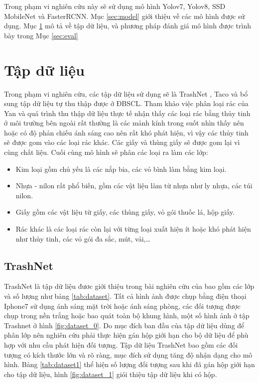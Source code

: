 \documentclass[../the.tex]{subfiles}
\begin{document}
Trong phạm vi nghiên cứu này sẽ sử dụng mô hình Yolov7, Yolov8, SSD MobileNet và FasterRCNN. Mục \ref{sec:model} giới thiệu về các mô hình được sử dụng. Mục \ref{sec:dataset} mô tả về tập dữ liệu, và phương pháp đánh giá mô hình được trình bày trong Mục \ref{sec:eval}

\section{Tập dữ liệu}
\label{sec:dataset}

{\fontsize{13}{12} \selectfont
	Trong phạm vi nghiên cứu, các tập dữ liệu sử dụng sẽ là TrashNet \cite{yang2016classification}, Taco \cite{proença2020taco} và bổ sung tập dữ liệu tự thu thập được ở ĐBSCL.
	Tham khảo việc phân loại rác của Yan \cite{yang2016classification} và quá trình thu thập dữ liệu thực tế nhận thấy các loại rác bằng thủy tinh ở môi trường bên ngoài rất thường là các mảnh kính trong suốt nhìn thấy nên hoặc có độ phản chiếu ánh sáng cao nên rất khó phát hiện, vì vậy các thủy tinh sẽ được gom vào các loại rác khác.
	Các giấy và thùng giấy sẽ được gom lại vì cùng chất liệu. Cuối cùng mô hình sẽ phân các loại ra làm các lớp:
	\begin{itemize}
		\item Kim loại gồm chủ yếu là các nắp bia, các vỏ bình làm bằng kim loại.
		\item Nhựa - nilon rất phổ biến, gồm các vật liệu làm từ nhựa như ly nhựa, các túi nilon.
		\item Giấy gồm các vật liệu từ giấy, các thùng giấy, vỏ gói thuốc lá, hộp giấy.
		\item Rác khác là các loại rác còn lại với từng loại xuất hiện ít hoặc khó phát hiện như thủy tinh, các vỏ gói đa sắc,
		      mút, vải,\dots
	\end{itemize}

\subsection{TrashNet}
\label{sec:trashnet}
	{\fontsize{13}{12} \selectfont
		TrashNet là tập dữ liệu đươc giới thiệu trong bài nghiên cứu của \cite{yang2016classification} bao gồm các lớp và số lượng như bảng \ref{tab:dataset}. Tất cả hình ảnh được chụp bằng điện thoại Iphone7 sử dụng ánh sáng mặt trời hoặc ánh sáng phòng, các đối tượng được chụp trong nền trắng hoặc bao quát toàn bộ khung hình, một số hình ảnh ở tập Trashnet ở hình
		\ref{fig:dataset_0}.
		Do mục đích ban đầu của tập dữ liệu dùng để phân lớp nên nghiên cứu phải thực hiện gán hộp giới hạn cho bộ dữ liệu để phù hợp với nhu cầu phát hiện đối tượng. Tập dữ liệu TrashNet bao gồm các đối tượng có kích thước lớn và rõ ràng, mục đích sử dụng tăng độ nhận dạng cho mô hình. Bảng \ref{tab:dataset1} thể hiện số lượng đối tượng sau khi đã gán hộp giới hạn cho tập dữ liệu, hình
		\ref{fig:dataset_1} giói thiệu tập dữ liệu khi có hộp.
	}
}
\end{document}
